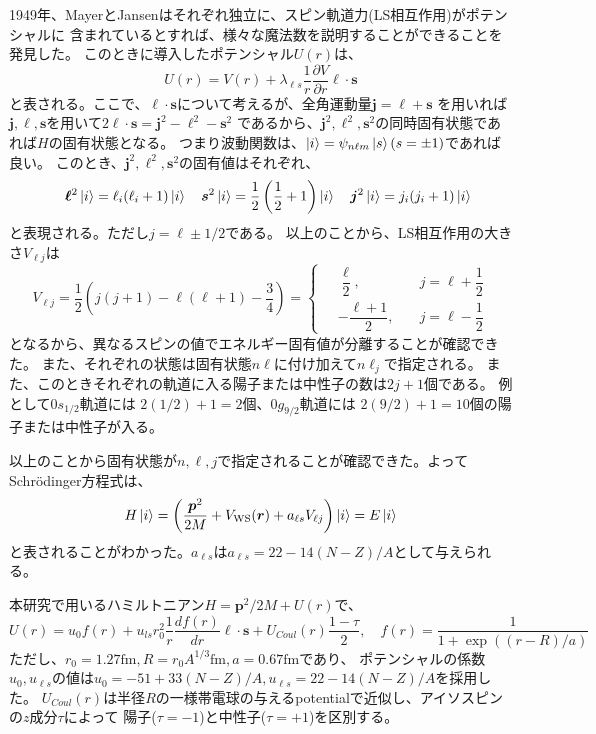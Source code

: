 \documentclass[a4paper]{jsarticle}
\begin{document}
1949年、MayerとJansenはそれぞれ独立に、スピン軌道力(LS相互作用)がポテンシャルに
含まれているとすれば、様々な魔法数を説明することができることを発見した。
このときに導入したポテンシャル$U(r)$は、
\begin{equation}
  U(r)=V(r)+\lambda_{\ell s}\dfrac{1}{r}\dfrac{\partial V}{\partial r}\bm{\ell}\cdot\bm{s}
\end{equation}
と表される。ここで、$\bm{\ell}\cdot\bm{s}$について考えるが、全角運動量$\bm{j}=\bm{\ell}+\bm{s}$
を用いれば$\bm{j},\bm{\ell},\bm{s}$を用いて$2\bm{\ell}\cdot\bm{s}=\bm{j}^2-\bm{\ell}^2-\bm{s}^2$
であるから、$\bm{j}^2,\bm{\ell}^2,\bm{s}^2$の同時固有状態であれば$H$の固有状態となる。
つまり波動関数は、$\ket{i}=\psi_{n\ell m}\ket{s}(s=\pm1)$であれば良い。
このとき、$\bm{j}^2,\bm{\ell}^2,\bm{s}^2$の固有値はそれぞれ、
\begin{equation}
  \quad\bm{\ell}^2\ket{i}=\ell_{i}(\ell_{i}+1)\ket{i}
  \quad\bm{s}^2\ket{i}=\dfrac{1}{2}\left(\dfrac{1}{2}+1\right)\ket{i}
  \quad\bm{j}^2\ket{i}=j_{i}(j_{i}+1)\ket{i}
\end{equation}
と表現される。ただし$j=\ell\pm1/2$である。
以上のことから、LS相互作用の大きさ$V_{\ell j}$は
\begin{equation}
  V_{\ell j}=\dfrac{1}{2}\left(
    j(j+1)-\ell(\ell+1)-\dfrac{3}{4}
  \right)
  =\left\{
    \begin{alignedat}{2}
      \ &\dfrac{\ell}{2},\quad&j=\ell+\dfrac{1}{2}\\
      \ &-\dfrac{\ell+1}{2},\quad&j=\ell-\dfrac{1}{2}
    \end{alignedat}
  \right.
\end{equation}
となるから、異なるスピンの値でエネルギー固有値が分離することが確認できた。
また、それぞれの状態は固有状態$n\ell$に付け加えて$n\ell_{j}$で指定される。
また、このときそれぞれの軌道に入る陽子または中性子の数は$2j+1$個である。
例として$0s_{1/2}$軌道には $2(1/2)+1=2$個、$0g_{9/2}$軌道には $2(9/2)+1=10$個の陽子または中性子が入る。

以上のことから固有状態が$n,\ell,j$で指定されることが確認できた。よってSchr\"{o}dinger方程式は、
\begin{equation}
  H\ket{i}=\left(\dfrac{\bm{p}^2}{2M} + V_{\text{WS}}(\bm{r})+a_{\ell s}V_{\ell j}\right)\ket{i}=E\ket{i}
\end{equation}
と表されることがわかった。$a_{\ell s}$は$a_{\ell s}=22-14(N-Z)/A$として与えられる。


本研究で用いるハミルトニアン$H=\bm{p}^2/2M+U(r)$で、
\begin{equation}
  U(r)=u_0f(r)+u_{ls}r_0^2\dfrac{1}{r}\dfrac{df(r)}{dr}\boldsymbol{\ell\cdot s}+U_{Coul}(r)\dfrac{1-\tau}{2},\quad f(r)=\dfrac{1}{1+\exp((r-R)/a)}
  \label{Hamiltonian}
\end{equation}
ただし、$r_0=1.27\text{fm},R=r_0A^{1/3}\text{fm},a=0.67\text{fm}$であり、
ポテンシャルの係数$u_0,u_{\ell s}$の値は$u_0=-51+33(N-Z)/A,u_{\ell s}=22-14(N-Z)/A$を採用した\cite{nucleus_structure}。
$U_{Coul}(r)$は半径$R$の一様帯電球の与えるpotentialで近似し、アイソスピンの$z$成分$\tau$によって
陽子($\tau=-1$)と中性子($\tau=+1$)を区別する。
\end{document}
